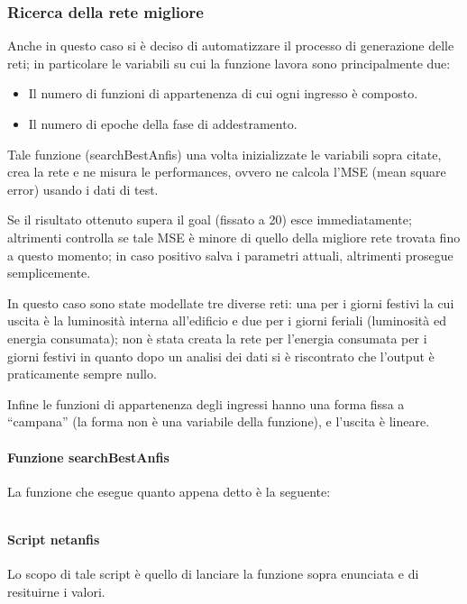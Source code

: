 \subsubsection{Ricerca della rete migliore}

Anche in questo caso si è deciso di automatizzare il processo di generazione delle reti; in particolare le variabili su cui la funzione lavora sono principalmente due:
\begin{itemize}
  \item Il numero di funzioni di appartenenza di cui ogni ingresso è composto.
  \item Il numero di epoche della fase di addestramento.
\end{itemize}

Tale funzione (searchBestAnfis) una volta inizializzate le variabili sopra citate, crea la rete e ne misura le performances, ovvero ne calcola l'MSE (mean square error) usando i dati di test.

Se il risultato ottenuto supera il goal (fissato a 20) esce immediatamente; altrimenti controlla se tale MSE è minore di quello della migliore rete trovata fino a questo momento; in caso positivo salva i parametri attuali, altrimenti prosegue semplicemente.

In questo caso sono state modellate tre diverse reti: una per i giorni festivi la cui uscita è la luminosità interna all'edificio e due per i giorni feriali (luminosità ed energia consumata); non è stata creata la rete per l'energia consumata per i giorni festivi in quanto dopo un analisi dei dati si è riscontrato che l'output è praticamente sempre nullo.

Infine le funzioni di appartenenza degli ingressi hanno una forma fissa a “campana” (la forma non è una variabile della funzione), e l'uscita è lineare.


\paragraph{Funzione searchBestAnfis}
La funzione che esegue quanto appena detto è la seguente:

\inputminted[linenos=true,fontsize=\footnotesize]{matlab}{../../src/anfis/functions/searchBestAnfis.m}


\paragraph{Script netanfis}
Lo scopo di tale script è quello di lanciare la funzione sopra enunciata e di resituirne i valori.

